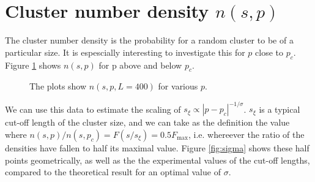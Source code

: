 \documentclass[12pt]{article}
\begin{document}
\section{Cluster number density $n(s,p)$}
The cluster number density is the probability for a random cluster to be of a particular size. It is espescially interesting to investigate this for $p$ close to $p_c$. Figure \ref{fig:5} shows $n(s,p)$ for p above and below $p_c$. 


\begin{figure}[ht]
\centering
{}
\caption[Optional caption for list of figures]{The plots show $n(s,p,L=400)$ for various $p$.}
\label{fig:5}
\end{figure}

We can use this data to estimate the scaling of $s_\xi \propto |p-p_c|^{-1/\sigma}$. $s_\xi$ is a typical cut-off length of the cluster size, and we can take as the definition the value where $n(s,p)/n(s,p_c) = F(s/s_\xi) = 0.5F_\text{max}$, i.e. whereever the ratio of the densities have fallen to half its maximal value. Figure \ref{fig:sigma} shows these half points geometrically, as well as the the experimental values of the cut-off lengths, compared to the theoretical result for an optimal value of $\sigma$. 
\end{document}
